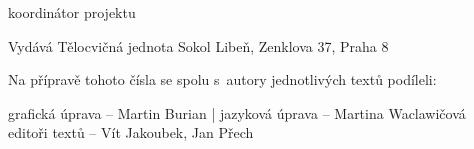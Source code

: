\documentclass[11pt]{article}
\begin{document}
\signature{Vít Jakoubek}{koordinátor projektu}
\vspace*{24pt}

\clearpage

\pagestyle{blank}

\vspace*{96pt}

\pagecolor{sokolred}
\color{white}


\vspace*{\fill}

\begin{center}
Vydává Tělocvičná jednota Sokol Libeň, Zenklova 37, Praha 8

\vspace*{12pt}

Na přípravě tohoto čísla se spolu s~autory jednotlivých textů podíleli:

grafická úprava – Martin Burian | jazyková úprava – Martina Waclawičová \\ editoři textů – Vít Jakoubek, Jan Přech
\end{center}
\end{document}
